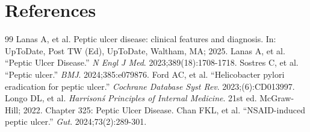 \section*{References}
\begin{thebibliography}{99}
 Lanas A, et al. Peptic ulcer disease: clinical features and diagnosis. In: UpToDate, Post TW (Ed), UpToDate, Waltham, MA; 2025.
 Lanas A, et al. ``Peptic Ulcer Disease.'' \emph{N Engl J Med}. 2023;389(18):1708-1718.
 Sostres C, et al. ``Peptic ulcer.'' \emph{BMJ}. 2024;385:e079876.
 Ford AC, et al. ``Helicobacter pylori eradication for peptic ulcer.'' \emph{Cochrane Database Syst Rev}. 2023;(6):CD013997.
 Longo DL, et al. \emph{Harrison\'s Principles of Internal Medicine}. 21st ed. McGraw-Hill; 2022. Chapter 325: Peptic Ulcer Disease.
 Chan FKL, et al. ``NSAID-induced peptic ulcer.'' \emph{Gut}. 2024;73(2):289-301.
\end{thebibliography}
